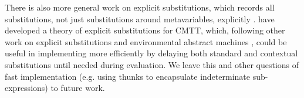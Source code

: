 %
There is also more general work on explicit substitutions, which records all  substitutions, not just substitutions around metavariables, explicitly \cite{Abadi:1991fr,levy1999explicit,Abadi:1990ys}.  \citet{DBLP:journals/corr/abs-1009-2789} have developed a theory of explicit substitutions for CMTT, which, following other work on explicit substitutions and environmental abstract machines \cite{DBLP:journals/tcs/Curien91}, could be useful in implementing \HazelnutLive more efficiently by delaying both standard and contextual substitutions until needed during evaluation. We leave this and other questions of fast implementation (e.g. using thunks to encapsulate indeterminate sub-expressions) to future work. 







